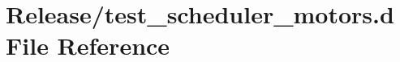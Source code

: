 \hypertarget{test__scheduler__motors_8d}{}\section{Release/test\+\_\+scheduler\+\_\+motors.d File Reference}
\label{test__scheduler__motors_8d}
